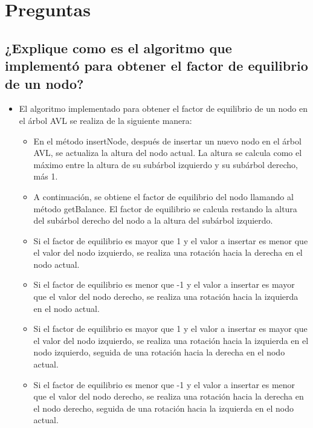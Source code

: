 \documentclass{article}
\begin{document}
	\section{Preguntas}
	\subsection{¿Explique como es el algoritmo que implementó para obtener el factor de equilibrio de un nodo?}
	
	\begin{itemize}
		\item El algoritmo implementado para obtener el factor de equilibrio de un nodo en el árbol AVL se realiza de la siguiente manera:
		
		\begin{itemize}
			\item En el método insertNode, después de insertar un nuevo nodo en el árbol AVL, se actualiza la altura del nodo actual. La altura se calcula como el máximo entre la altura de su subárbol izquierdo y su subárbol derecho, más 1.
			\item A continuación, se obtiene el factor de equilibrio del nodo llamando al método getBalance. El factor de equilibrio se calcula restando la altura del subárbol derecho del nodo a la altura del subárbol izquierdo.
			\item Si el factor de equilibrio es mayor que 1 y el valor a insertar es menor que el valor del nodo izquierdo, se realiza una rotación hacia la derecha en el nodo actual.
			\item Si el factor de equilibrio es menor que -1 y el valor a insertar es mayor que el valor del nodo derecho, se realiza una rotación hacia la izquierda en el nodo actual.
			\item Si el factor de equilibrio es mayor que 1 y el valor a insertar es mayor que el valor del nodo izquierdo, se realiza una rotación hacia la izquierda en el nodo izquierdo, seguida de una rotación hacia la derecha en el nodo actual.
			\item Si el factor de equilibrio es menor que -1 y el valor a insertar es menor que el valor del nodo derecho, se realiza una rotación hacia la derecha en el nodo derecho, seguida de una rotación hacia la izquierda en el nodo actual.
		\end{itemize}


\end{itemize}
\end{document}
